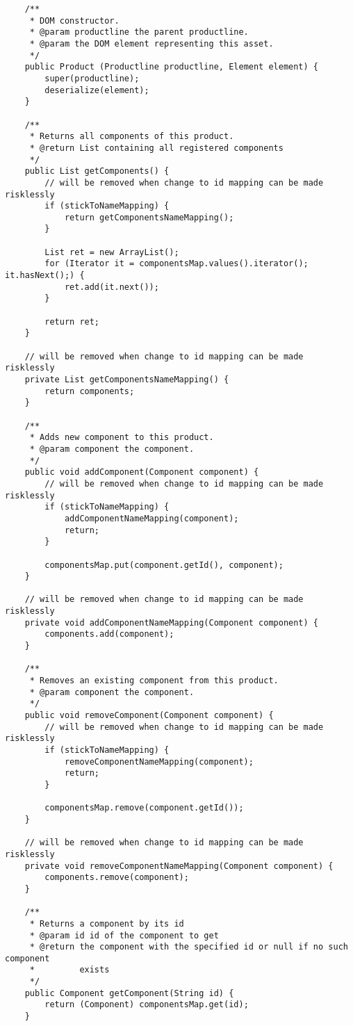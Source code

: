 \begin{verbatim}
	/**
	 * DOM constructor.
	 * @param productline the parent productline.
	 * @param the DOM element representing this asset.
	 */
	public Product (Productline productline, Element element) {
	    super(productline);
		deserialize(element);
	}
	
	/**
	 * Returns all components of this product.
     * @return List containing all registered components
	 */
	public List getComponents() {
        // will be removed when change to id mapping can be made risklessly
        if (stickToNameMapping) {
            return getComponentsNameMapping();
        }
		
        List ret = new ArrayList();
        for (Iterator it = componentsMap.values().iterator(); it.hasNext();) {
            ret.add(it.next());
        }
        
        return ret;
	}
	
    // will be removed when change to id mapping can be made risklessly
	private List getComponentsNameMapping() {
        return components;
    }
    
	/**
	 * Adds new component to this product.
	 * @param component the component.
	 */
    public void addComponent(Component component) {
        // will be removed when change to id mapping can be made risklessly
        if (stickToNameMapping) {
            addComponentNameMapping(component);
            return;
        }
        
        componentsMap.put(component.getId(), component);
    }
    
    // will be removed when change to id mapping can be made risklessly
	private void addComponentNameMapping(Component component) {
		components.add(component);
	}

	/**
	 * Removes an existing component from this product.
	 * @param component the component.
	 */
	public void removeComponent(Component component) {
        // will be removed when change to id mapping can be made risklessly
		if (stickToNameMapping) {
            removeComponentNameMapping(component);
            return;
        }
        
        componentsMap.remove(component.getId());
    }
    
    // will be removed when change to id mapping can be made risklessly
    private void removeComponentNameMapping(Component component) {
		components.remove(component);
	}
    
    /**
     * Returns a component by its id
     * @param id id of the component to get
     * @return the component with the specified id or null if no such component
     *         exists
     */
    public Component getComponent(String id) {
        return (Component) componentsMap.get(id);
    }


\end{verbatim}
